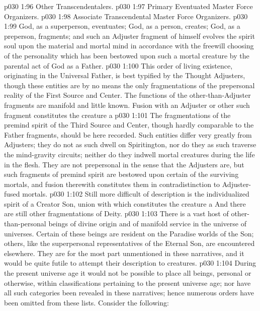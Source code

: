 \vs p030 1:96 \bibnobreakspace Other Transcendentalers.
\vs p030 1:97 \bibnobreakspace Primary Eventuated Master Force Organizers.
\vs p030 1:98 \bibnobreakspace Associate Transcendental Master Force Organizers.
\pc \vs p030 1:99 God, as a superperson, eventuates; God, as a person, creates; God, as a preperson, fragments; and such an Adjuster fragment of himself evolves the spirit soul upon the material and mortal mind in accordance with the freewill choosing of the personality which has been bestowed upon such a mortal creature by the parental act of God as a Father.
\pc \vs p030 1:100 \bibnobreakspace {} This order of living existence, originating in the Universal Father, is best typified by the Thought Adjusters, though these entities are by no means the only fragmentations of the prepersonal reality of the First Source and Center. The functions of the other\hyp{}than\hyp{}Adjuster fragments are manifold and little known. Fusion with an Adjuster or other such fragment constitutes the creature a 
\vs p030 1:101 The fragmentations of the premind spirit of the Third Source and Center, though hardly comparable to the Father fragments, should be here recorded. Such entities differ very greatly from Adjusters; they do not as such dwell on Spiritington, nor do they as such traverse the mind\hyp{}gravity circuits; neither do they indwell mortal creatures during the life in the flesh. They are not prepersonal in the sense that the Adjusters are, but such fragments of premind spirit are bestowed upon certain of the surviving mortals, and fusion therewith constitutes them  in contradistinction to Adjuster\hyp{}fused mortals.
\vs p030 1:102 Still more difficult of description is the individualized spirit of a Creator Son, union with which constitutes the creature a  And there are still other fragmentations of Deity.
\pc \vs p030 1:103 \bibnobreakspace {} There is a vast host of other\hyp{}than\hyp{}personal beings of divine origin and of manifold service in the universe of universes. Certain of these beings are resident on the Paradise worlds of the Son; others, like the superpersonal representatives of the Eternal Son, are encountered elsewhere. They are for the most part unmentioned in these narratives, and it would be quite futile to attempt their description to  creatures.
\pc \vs p030 1:104 \kern4pt\bibnobreakspace {} During the present universe age it would not be possible to place all beings, personal or otherwise, within classifications pertaining to the present universe age; nor have all such categories been revealed in these narratives; hence numerous orders have been omitted from these lists. Consider the following:
